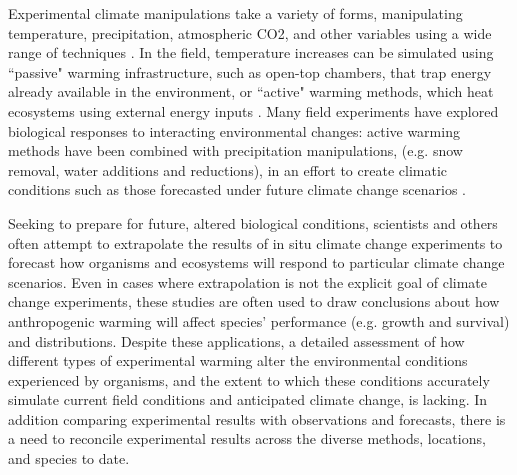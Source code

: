 \documentclass{article}
\begin{document}
\par Experimental climate manipulations take a variety of forms, manipulating temperature, precipitation, atmospheric CO2, and other variables using a wide range of techniques \citep{shaver2000,aronson2009}. In the field, temperature increases can be simulated using ``passive" warming infrastructure, such as open-top chambers, that trap energy already available in the environment, or ``active" warming methods, which heat ecosystems using external energy inputs  \citep[e.g. gas-powered forced air heaters, electrical-powered soil warming cables or infrared heaters][]{shaver2000}. Many field experiments have explored biological responses to interacting environmental changes: active warming methods have been combined with precipitation manipulations, (e.g. snow removal,  water additions and reductions), in  an  effort to create  climatic  conditions such  as  those  forecasted  under  future climate  change scenarios \citep [e.g.][]{price1998,cleland2006,sherry2007,rollinson2012}.
\par Seeking to prepare  for future, altered  biological conditions, scientists and others  often attempt to extrapolate the results of in situ climate change experiments to forecast how organisms and ecosystems will respond to particular climate change scenarios.  Even in cases where extrapolation is not the explicit goal of climate change experiments, these studies are often used to draw conclusions  about how anthropogenic warming  will affect species' performance  (e.g. growth and  survival)  and  distributions\citep{dukes1999,hobbie1999,reich2015,gruner2016}.  Despite these applications, a detailed  assessment of how different types of experimental warming alter the environmental conditions experienced by organisms, and the extent to which these conditions accurately simulate current field conditions and anticipated climate change, is lacking.  In addition comparing experimental results with observations and forecasts, there is a need to reconcile experimental results across the diverse methods, locations, and species to date. 
\end{document}
